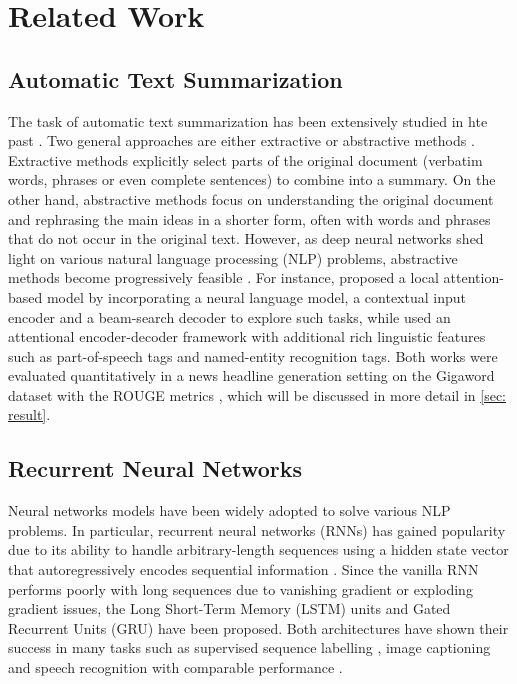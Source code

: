 \section{Related Work}
\label{sec: related_work}

\subsection{Automatic Text Summarization}

The task of automatic text summarization has been extensively studied in hte past \cite{gambhir2017recent}. Two general approaches are either extractive or abstractive methods \cite{gupta2010survey}. Extractive methods explicitly select parts of the original document (verbatim words, phrases or even complete sentences) to combine into a summary. On the other hand, abstractive methods focus on understanding the original document and rephrasing the main ideas in a shorter form, often with words and phrases that do not occur in the original text.  However, as deep neural networks shed light on various natural language processing (NLP) problems, abstractive methods become progressively feasible \cite{nallapati2016sequence, nallapati2016abstractive, rush2015neural}. For instance, \cite{rush2015neural} proposed a local attention-based model by incorporating a neural language model, a contextual input encoder and a beam-search decoder to explore such tasks, while \cite{nallapati2016abstractive} used an attentional encoder-decoder framework with additional rich linguistic features such as part-of-speech tags and named-entity recognition tags. Both works were evaluated quantitatively in a news headline generation setting on the Gigaword dataset \cite{graff2003english} with the ROUGE metrics \cite{lin2004rouge}, which will be discussed in more detail in \ref{sec: result}. 

\subsection{Recurrent Neural Networks}
Neural networks models have been widely adopted to solve various NLP problems. In particular, recurrent neural networks (RNNs) has gained popularity due to its ability to handle arbitrary-length sequences using a hidden state vector that autoregressively encodes sequential information \cite{goodfellow2016}. Since the vanilla RNN performs poorly with long sequences due to vanishing gradient or exploding gradient issues, the Long Short-Term Memory (LSTM) units \cite{hochreiter1997long} and Gated Recurrent Units (GRU) \cite{cho2014properties} have been proposed. Both architectures have shown their success in many tasks such as supervised sequence labelling \cite{graves2012supervised}, image captioning \cite{vinyals_2015} and speech recognition \cite{graves2013speech} with comparable performance \cite{yin2017comparative}.


